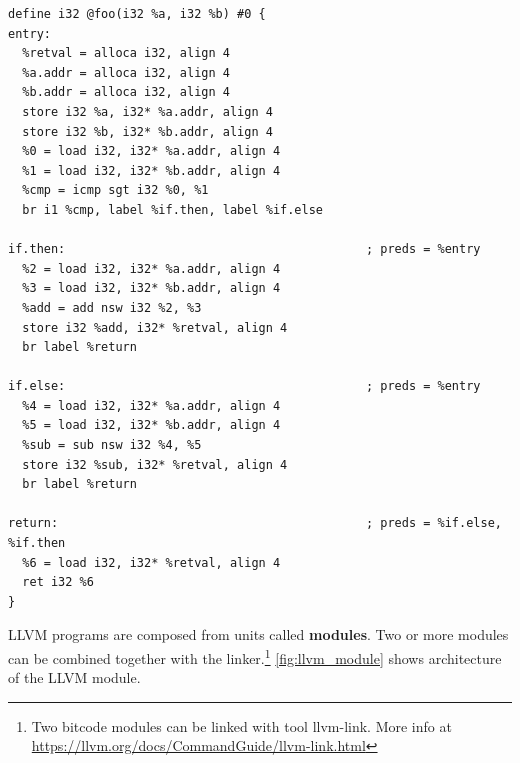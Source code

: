 \documentclass[12pt, twoside]{fithesis2}
\renewcommand{\_}{\leavevmode \kern0.07em\vbox{\hrule width0.4em}}
\begin{document}
\begin{verbatim}
define i32 @foo(i32 %a, i32 %b) #0 {
entry:
  %retval = alloca i32, align 4
  %a.addr = alloca i32, align 4
  %b.addr = alloca i32, align 4
  store i32 %a, i32* %a.addr, align 4
  store i32 %b, i32* %b.addr, align 4
  %0 = load i32, i32* %a.addr, align 4
  %1 = load i32, i32* %b.addr, align 4
  %cmp = icmp sgt i32 %0, %1
  br i1 %cmp, label %if.then, label %if.else

if.then:                                          ; preds = %entry
  %2 = load i32, i32* %a.addr, align 4
  %3 = load i32, i32* %b.addr, align 4
  %add = add nsw i32 %2, %3
  store i32 %add, i32* %retval, align 4
  br label %return

if.else:                                          ; preds = %entry
  %4 = load i32, i32* %a.addr, align 4
  %5 = load i32, i32* %b.addr, align 4
  %sub = sub nsw i32 %4, %5
  store i32 %sub, i32* %retval, align 4
  br label %return

return:                                           ; preds = %if.else, %if.then
  %6 = load i32, i32* %retval, align 4
  ret i32 %6
}
\end{verbatim}

LLVM programs are composed from units called \textbf{modules}. Two or more
modules can be combined together with the linker.\footnote{
Two bitcode modules can be linked with tool llvm-link. More info at
\url{https://llvm.org/docs/CommandGuide/llvm-link.html}
}
\autoref{fig:llvm_module} shows architecture of the LLVM module.
\end{document}
